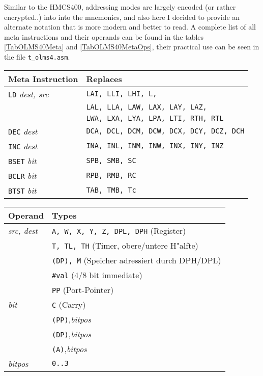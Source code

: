 \documentclass[12pt,twoside]{report}
\newcommand{\tty}[1]{{\tt #1}}
\begin{document}
Similar to the HMCS400, addressing modes are largely encoded (or
rather encrypted..) into into the mnemonics, and also here I
decided to provide an alternate notation that is more modern and
better to read.  A complete list of all meta instructions and
their operands can be found in the tables \ref{TabOLMS40Meta} and
\ref{TabOLMS40MetaOps}, their practical use can be seen in the
file \tty{t\_olms4.asm}.

\begin{table*}
\begin{center}\begin{tabular}{|l|l|}
\hline
Meta Instruction          & Replaces \\
\hline
\tty{LD} {\em dest, src}        & \tty{LAI, LLI, LHI, L,} \\
                                & \tty{LAL, LLA, LAW, LAX, LAY, LAZ,} \\
                                & \tty{LWA, LXA, LYA, LPA, LTI, RTH, RTL} \\
\tty{DEC} {\em dest}            & \tty{DCA, DCL, DCM, DCW, DCX, DCY, DCZ, DCH} \\
\tty{INC} {\em dest}            & \tty{INA, INL, INM, INW, INX, INY, INZ} \\
\tty{BSET} {\em bit}            & \tty{SPB, SMB, SC} \\
\tty{BCLR} {\em bit}            & \tty{RPB, RMB, RC} \\
\tty{BTST} {\em bit}            & \tty{TAB, TMB, Tc} \\
\hline
\end{tabular}\end{center}
\caption{Meta Instructions OLMS-40}
\label{TabOLMS40Meta}
\end{table*}

\begin{table*}
\begin{center}\begin{tabular}{|l|l|}
\hline
Operand                 & Types \\
\hline
{\em src, dest}         & \tty{A, W, X, Y, Z, DPL, DPH} (Register) \\
                        & \tty{T, TL, TH} (Timer, obere/untere H"alfte) \\
                        & \tty{(DP), M} (Speicher adressiert durch DPH/DPL) \\
                        & \tty{\#val} (4/8 bit immediate) \\
                        & \tty{PP} (Port-Pointer) \\
{\em bit}               & \tty{C} (Carry) \\
                        & \tty{(PP)},{\em bitpos} \\
                        & \tty{(DP)},{\em bitpos} \\
                        & \tty{(A)},{\em bitpos} \\
{\em bitpos}            & \tty{0..3} \\
\hline
\end{tabular}\end{center}
\caption{Operand Types for OLMS-40 Meta Instructions}
\label{TabOLMS40MetaOps}
\end{table*}
\end{document}
